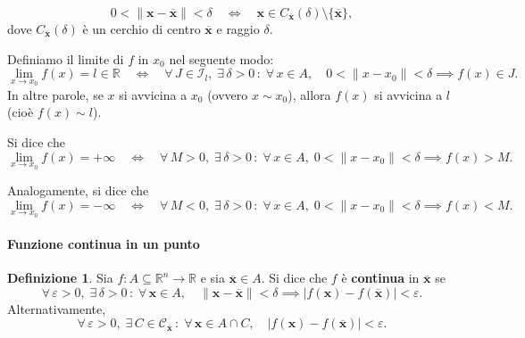 \documentclass{article}
\theoremstyle{plain}
\theoremstyle{definition}
\newtheorem{defn}{Definizione}[section]
\theoremstyle{remark}
\begin{document}
\vspace{10pt}


\[
0 < \|\mathbf{x}-\overline{\mathbf{x}}\| < \delta \quad \iff \quad \mathbf{x} \in C_{\overline{\mathbf{x}}}(\delta) \setminus \{\overline{\mathbf{x}}\},
\]
dove \(C_{\overline{\mathbf{x}}}(\delta)\) è un cerchio di centro \(\overline{\mathbf{x}}\) e raggio \(\delta\).

Definiamo il limite di \(f\) in \(x_0\) nel seguente modo:
\[
\lim_{x\to x_0} f(x) = l \in \mathbb{R} \quad \iff \quad \forall\, J\in\mathcal{I}_l,\; \exists\, \delta > 0\,:\; \forall\, x \in A,\quad 0 < \|x - x_0\| < \delta\implies f(x) \in J.
\]
In altre parole, se \(x\) si avvicina a \(x_0\) (ovvero \(x \sim x_0\)), allora \(f(x)\) si avvicina a \(l\) (cioè \(f(x) \sim l\)).

Si dice che
\[
\lim_{x\to x_0} f(x) = +\infty \quad \iff \quad \forall\, M > 0,\; \exists\, \delta > 0\,:\;\forall\, x \in A,\; 0 < \|x - x_0\| < \delta\implies f(x) > M.
\]

Analogamente, si dice che
\[
\lim_{x\to x_0} f(x) = -\infty \quad \iff \quad \forall\, M < 0,\; \exists\, \delta > 0 \,:\; \forall\, x \in A,\; 0 < \|x - x_0\| < \delta\implies f(x) < M.
\]

\vspace{10pt}

\paragraph{Funzione continua in un punto}
\begin{bxthm}
\begin{defn}
    Sia $f:A\subseteq\mathbb{R}^n\to\mathbb{R}$ e sia $\overline{\mathbf{x}}\in A$. 
    Si dice che $f$ è \textbf{continua} in $\overline{\mathbf{x}}$ se 
    \[\forall\,\varepsilon>0,\;\exists\,\delta>0\,:\;\forall\, \mathbf{x}\in A,\quad\| \mathbf{x}-\overline{\mathbf{x}} \|<\delta \implies|f(\mathbf{x})-f(\overline{\mathbf{x}})|<\varepsilon.\]
    Alternativamente, 
    \[\forall\,\varepsilon>0,\;\exists\,C\in\mathcal{C}_{\overline{\mathbf{x}}}\,:\;\forall\, \mathbf{x}\in A\cap C,\quad|f(\mathbf{x})-f(\overline{\mathbf{x}})|<\varepsilon.\]
\end{defn}
\end{bxthm}
\end{document}
